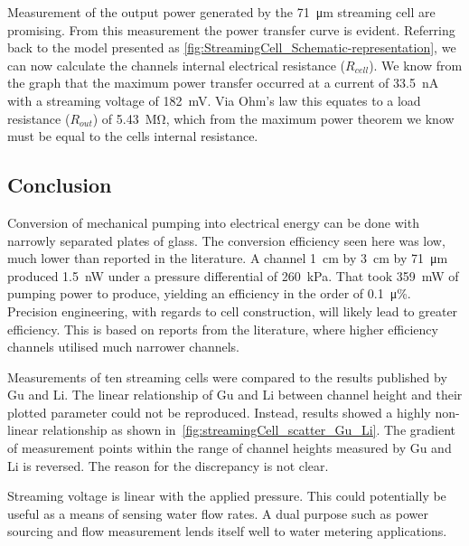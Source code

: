     Measurement of the output power generated by the \SI{71}{\micro\meter} streaming cell are promising.
    From this measurement the power transfer curve is evident.
    Referring back to the model presented as \cref{fig:StreamingCell_Schematic-representation}, we can now calculate the channels internal electrical resistance ($R_{cell}$).
    We know from the graph that the maximum power transfer occurred at a current of \SI{33.5}{\nano\ampere} with a streaming voltage of \SI{182}{\milli\volt}.
    Via Ohm's law this equates to a load resistance ($R_{out}$) of \SI{5.43}{\mega\ohm}, which from the maximum power theorem we know must be equal to the cells internal resistance.


  \subsection{Conclusion}


    Conversion of mechanical pumping into electrical energy can be done with narrowly separated plates of glass.
    The conversion efficiency seen here was low, much lower than reported in the literature.
    A channel \SI{1}{\centi\meter} by \SI{3}{\centi\meter} by \SI{71}{\micro\meter} produced \SI{1.5}{\nano\watt} under a pressure differential of \SI{260}{\kilo\pascal}.
    That took \SI{359}{\milli\watt} of pumping power to produce, yielding an efficiency in the order of \SI{0.1}{\micro\percent}.
    Precision engineering, with regards to cell construction, will likely lead to greater efficiency.
    This is based on reports from the literature, where higher efficiency channels utilised much narrower channels.

    Measurements of ten streaming cells were compared to the results published by Gu and Li.
    The linear relationship of Gu and Li between channel height and their plotted parameter could not be reproduced.
    Instead, results showed a highly non-linear relationship as shown in~\cref{fig:streamingCell_scatter_Gu_Li}.
    The gradient of measurement points within the range of channel heights measured by Gu and Li is reversed.
    The reason for the discrepancy is not clear.

    Streaming voltage is linear with the applied pressure.
    This could potentially be useful as a means of sensing water flow rates.
    A dual purpose such as power sourcing and flow measurement lends itself well to water metering applications.
